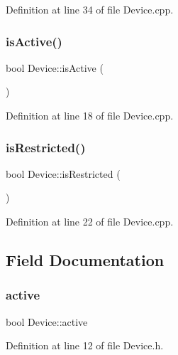 Definition at line 34 of file Device.\+cpp.

\mbox{\label{class_device_a6b2f2b45d71f1ecda445896e0429e22c}} 
\subsubsection{\texorpdfstring{is\+Active()}{isActive()}}
{\footnotesize\ttfamily bool Device\+::is\+Active (\begin{DoxyParamCaption}{ }\end{DoxyParamCaption})}



Definition at line 18 of file Device.\+cpp.

\mbox{\label{class_device_a0ea3f1723c41ee958c753ef9b3b1a413}} 
\subsubsection{\texorpdfstring{is\+Restricted()}{isRestricted()}}
{\footnotesize\ttfamily bool Device\+::is\+Restricted (\begin{DoxyParamCaption}{ }\end{DoxyParamCaption})}



Definition at line 22 of file Device.\+cpp.



\subsection{Field Documentation}
\mbox{\label{class_device_ac6c8534a9c755b5ee9affc37771a301d}} 
\subsubsection{\texorpdfstring{active}{active}}
{\footnotesize\ttfamily bool Device\+::active\hspace{0.3cm}{\ttfamily [private]}}



Definition at line 12 of file Device.\+h.

